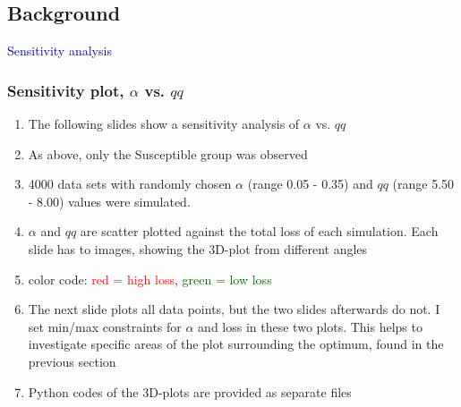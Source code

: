 \documentclass{beamer}
\begin{document}
\subsection{Background}
\begin{frame}
	\centering
	\textcolor{darkblue}{\huge{Sensitivity analysis}}
\end{frame}
\begin{frame}
	\frametitle{Sensitivity plot, $\alpha$ vs. $qq$}
	\begin{enumerate}[$\bullet$]
		\item The following slides show a sensitivity analysis of $\alpha$ vs. $qq$
		\item As above, only the Susceptible group was observed
		\item 4000 data sets with randomly chosen $\alpha$ (range 0.05 - 0.35) and $qq$ (range 5.50 - 8.00) values were simulated.\\
		\item $\alpha$ and $qq$ are scatter plotted against the total loss of each simulation. Each slide has to images, showing the 3D-plot from different angles
		\item color code: \textcolor{red}{red = high loss}, \textcolor{darkgreen}{green = low loss}
		\item The next slide plots all data points, but the two slides afterwards do not. I set min/max constraints for $\alpha$
			and loss in these two plots. This helps to investigate specific areas of the plot surrounding the optimum, found in the previous section 
		\item Python codes of the 3D-plots are provided as separate files
	\end{enumerate}
\end{frame}
\end{document}
